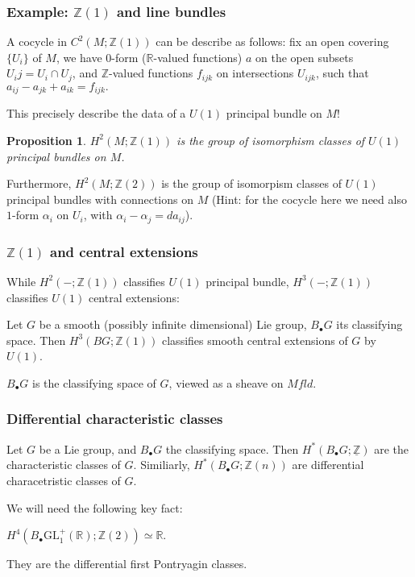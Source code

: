 \documentclass{beamer}
\newcommand{\Z}{\mathbb Z}
\newcommand{\R}{\mathbb R}
\newcommand{\GL}{\mathrm{GL}}
\newcommand{\Bdot}{B_\bullet}
\newcommand{\BdotG}{B_\bullet G}
\newtheorem{prop}[equation]{Proposition}
\begin{document}
\begin{frame}
    \frametitle{Example: $\Z(1)$ and line bundles}
    A cocycle in $C^2(M; \Z(1))$ can be describe as follows:
    fix an open covering $\{U_i\}$ of $M$, we have $0$-form ($\R$-valued functions) $a$ on 
    the open subsets $U_ij = U_i \cap U_j$, and $\Z$-valued functions $f_{ijk}$ on intersections $U_{ijk}$, such that 
    $a_{ij} - a_{jk} + a_{ik} = f_{ijk}.$\pause \vspace{5mm}

    This precisely describe the data of a $U(1)$ principal bundle on $M$!
    \begin{prop}
        $H^2(M; \Z(1))$ is the group of isomorphism classes of $U(1)$ principal bundles on $M$.
    \end{prop}

    Furthermore, $H^2(M; \Z(2))$ is the group of isomorpism classes of $U(1)$ principal bundles with connections on $M$ 
    (Hint: for the cocycle here we need also $1$-form $\alpha_i$ on $U_i$, with $\alpha_i - \alpha_j = d a_{ij}$).
\end{frame}

\begin{frame}
    \frametitle{$\Z(1)$ and central extensions}
    While $H^2(-; \Z(1))$ classifies $U(1)$ principal bundle, $H^3(-; \Z(1))$ classifies 
    $U(1)$ central extensions: \pause

    \begin{theorem}
        Let $G$ be a smooth (possibly infinite dimensional) Lie group, $\BdotG$ 
        its classifying space. Then 
        $H^3(BG; \Z(1))$ classifies smooth central extensions of $G$ by $U(1)$.
    \end{theorem} \pause 

    $\BdotG$ is the classifying space of $G$, viewed as a sheave on $Mfld$.

\end{frame}

\begin{frame}
    \frametitle{Differential characteristic classes}
    Let $G$ be a Lie group, and $\Bdot G$ the classifying space. Then $H^*(\Bdot G; \underline{\Z})$ 
    are the characteristic classes of $G$. Similiarly, $H^*(\Bdot G; \Z(n))$ are differential 
    characetristic classes of $G$. \pause \vspace{5mm}

    We will  need the following key fact:
    \begin{theorem}
        $H^4(\Bdot\GL_1^+(\R); \Z(2)) \simeq \R$.
    \end{theorem} \pause \vspace{5mm}

    They are the differential first Pontryagin classes.
\end{frame}
\end{document}
